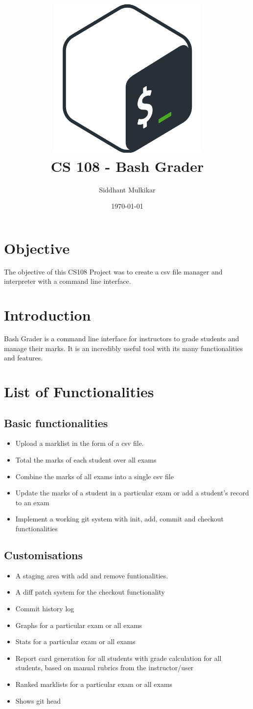 \documentclass{article}
\title{\includegraphics[width=8cm]{bashlogo.png} \\[2cm] CS 108 - Bash Grader}
\author{Siddhant Mulkikar}
\date{\today}
\begin{document}
\maketitle
\newpage
\tableofcontents
\newpage

\section{Objective}
The objective of this CS108 Project was to create a csv file manager and interpreter with a command line interface.

\section{Introduction}
Bash Grader is a command line interface for instructors to grade students and manage their marks. It is an incredibly useful tool with its many functionalities and features. 

\section{List of Functionalities}
\subsection{Basic functionalities}
\begin{itemize}
    \item Upload a marklist in the form of a csv file.
    \item Total the marks of each student over all exams
    \item Combine the marks of all exams into a single csv file
    \item Update the marks of a student in a particular exam or add a student's record to an exam
    \item Implement a working git system with init, add, commit and checkout functionalities
\end{itemize}
\subsection{Customisations}
\begin{itemize}
    \item A staging area with add and remove funtionalities.
    \item A diff patch system for the checkout functionality
    \item Commit history log
    \item Graphs for a particular exam or all exams
    \item Stats for a particular exam or all exams
    \item Report card generation for all students with grade calculation for all students, based on manual rubrics from the instructor/user
    \item Ranked marklists for a particular exam or all exams
    \item Shows git head
\end{itemize}
\newpage
\end{document}

